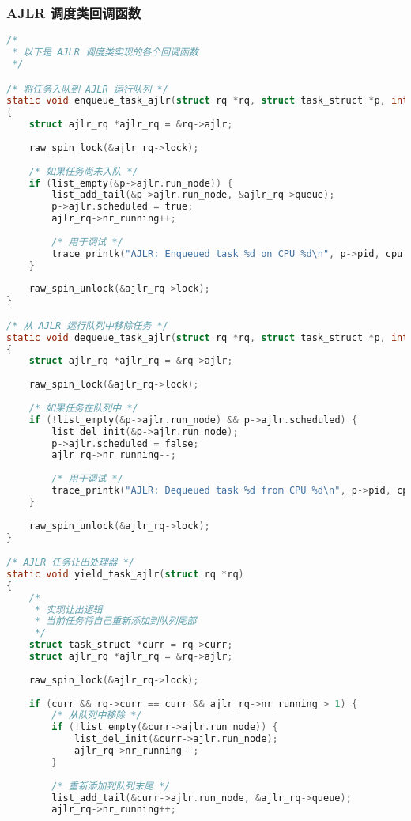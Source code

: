 \documentclass[a4paper,12pt]{article}
\begin{document}
\subsubsection{AJLR 调度类回调函数}

\begin{lstlisting}[language=C]
/*
 * 以下是 AJLR 调度类实现的各个回调函数
 */

/* 将任务入队到 AJLR 运行队列 */
static void enqueue_task_ajlr(struct rq *rq, struct task_struct *p, int flags)
{
    struct ajlr_rq *ajlr_rq = &rq->ajlr;
    
    raw_spin_lock(&ajlr_rq->lock);
    
    /* 如果任务尚未入队 */
    if (list_empty(&p->ajlr.run_node)) {
        list_add_tail(&p->ajlr.run_node, &ajlr_rq->queue);
        p->ajlr.scheduled = true;
        ajlr_rq->nr_running++;
    
        /* 用于调试 */
        trace_printk("AJLR: Enqueued task %d on CPU %d\n", p->pid, cpu_of(rq));
    }
    
    raw_spin_unlock(&ajlr_rq->lock);
}

/* 从 AJLR 运行队列中移除任务 */
static void dequeue_task_ajlr(struct rq *rq, struct task_struct *p, int flags)
{
    struct ajlr_rq *ajlr_rq = &rq->ajlr;
    
    raw_spin_lock(&ajlr_rq->lock);
    
    /* 如果任务在队列中 */
    if (!list_empty(&p->ajlr.run_node) && p->ajlr.scheduled) {
        list_del_init(&p->ajlr.run_node);
        p->ajlr.scheduled = false;
        ajlr_rq->nr_running--;
        
        /* 用于调试 */
        trace_printk("AJLR: Dequeued task %d from CPU %d\n", p->pid, cpu_of(rq));
    }
    
    raw_spin_unlock(&ajlr_rq->lock);
}

/* AJLR 任务让出处理器 */
static void yield_task_ajlr(struct rq *rq)
{
    /* 
     * 实现让出逻辑
     * 当前任务将自己重新添加到队列尾部
     */
    struct task_struct *curr = rq->curr;
    struct ajlr_rq *ajlr_rq = &rq->ajlr;
    
    raw_spin_lock(&ajlr_rq->lock);
    
    if (curr && rq->curr == curr && ajlr_rq->nr_running > 1) {
        /* 从队列中移除 */
        if (!list_empty(&curr->ajlr.run_node)) {
            list_del_init(&curr->ajlr.run_node);
            ajlr_rq->nr_running--;
        }
        
        /* 重新添加到队列末尾 */
        list_add_tail(&curr->ajlr.run_node, &ajlr_rq->queue);
        ajlr_rq->nr_running++;
        

\end{lstlisting}
\end{document}

